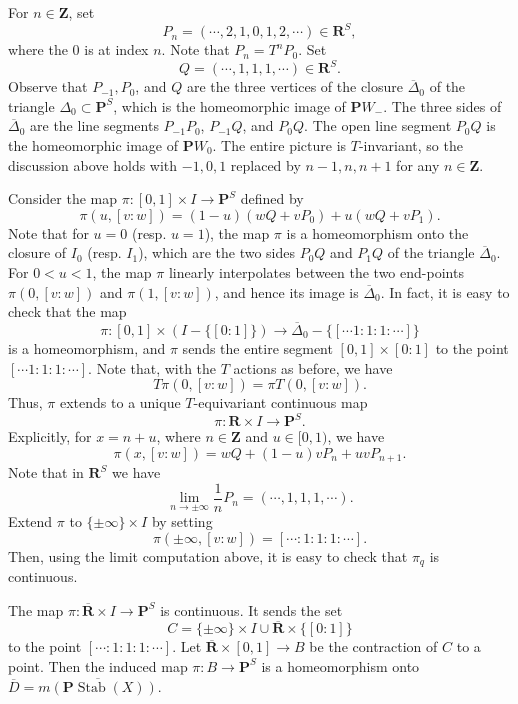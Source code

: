 \documentclass{amsart}
\begin{document}
For \(n \in \mathbf{Z}\), set
\[ P_n = (\cdots , 2 , 1,  0 , 1 , 2 , \cdots) \in \mathbf{R}^S,\]
where the \(0\) is at index \(n\).
Note that \(P_n = T^nP_0\).
Set
\[ Q = (\cdots , 1, 1, 1, \cdots ) \in \mathbf{R}^S.\]
Observe that \(P_{-1}, P_{0}\), and \(Q\) are the three vertices of the closure \(\overline{\Delta}_0\) of the triangle \(\Delta_0 \subset \mathbf{P}^S\), which is the homeomorphic image of \(\mathbf{P}W_-\).
The three sides of  \(\overline{\Delta}_0\) are the line segments \(P_{-1}P_0\), \(P_{-1}Q\), and \(P_0 Q\).
The open line segment \(P_0Q\) is the homeomorphic image of \(\mathbf{P}W_0\).
The entire picture is \(T\)-invariant, so the discussion above holds with \(-1,0,1\) replaced by \(n-1,n,n+1\) for any \(n \in \mathbf{Z}\).

Consider the map \(\pi \colon [0,1] \times I \to \mathbf{P}^S\) defined by
\[ \pi(u,[v:w]) = (1-u)(wQ + vP_0) + u (wQ + vP_1).\]
Note that for  \(u = 0\) (resp. \(u = 1\)), the map \(\pi\) is a homeomorphism onto the closure of \(I_0\) (resp. \(I_1\)), which are the two sides \(P_{0}Q\) and \(P_1Q\) of the triangle \(\overline{\Delta}_0\).
For \(0 < u < 1\), the map \(\pi\) linearly interpolates between the two end-points \(\pi(0,[v:w])\) and \(\pi(1,[v:w])\), and hence its image is \(\overline \Delta_0\).
In fact, it is easy to check that the map
\[ \pi \colon [0,1] \times \left(I - \{[0:1]\}\right) \to \overline \Delta_0 - \{[\cdots 1 : 1: 1: \cdots]\}\]
is a homeomorphism, and \(\pi\) sends the entire segment \([0,1] \times [0:1]\) to the point \([\cdots 1 : 1: 1: \cdots]\).
Note that, with the \(T\) actions as before, we have
\[ T \pi(0,[v:w]) = \pi T(0,[v:w]).\]
Thus, \(\pi\) extends to a unique \(T\)-equivariant continuous map
\[ \pi \colon \mathbf{R} \times I \to \mathbf{P}^S.\]
Explicitly, for \(x = n + u\), where \(n \in \mathbf{Z}\) and \(u \in [0,1)\), we have
\[ \pi(x,[v:w]) = w Q + (1-u) v P_n + uvP_{n+1}.\]
Note that in \(\mathbf{R}^S\) we have
\[ \lim_{n \to \pm\infty} \frac{1}{n}P_n = (\cdots, 1, 1, 1, \cdots).\]
Extend \(\pi\) to \(\{\pm \infty\} \times I\) by setting
\[ \pi(\pm \infty, [v:w]) = [\cdots : 1 : 1 : 1 : \cdots].\]
Then, using the limit computation above, it is easy to check that \(\pi_q\) is continuous.
\begin{theorem}\label{prop:pi}
  The map \(\pi \colon \overline{\mathbf{R}} \times I \to \mathbf{P}^S\) is continuous.
  It sends the set \[C = \{\pm \infty\} \times I \cup \overline{\mathbf{R}} \times \{[0:1]\}\]
  to the point \([\cdots: 1: 1: 1: \cdots]\).
  Let \(\overline{\mathbf{R}} \times [0,1] \to B\) be the contraction of \(C\) to a point.
  Then the induced map \(\pi \colon B \to \mathbf{P}^S\) is a homeomorphism onto \(\overline D = \overline{m(\mathbf{P}\operatorname{Stab}(X))}\).
\end{theorem}
\end{document}
